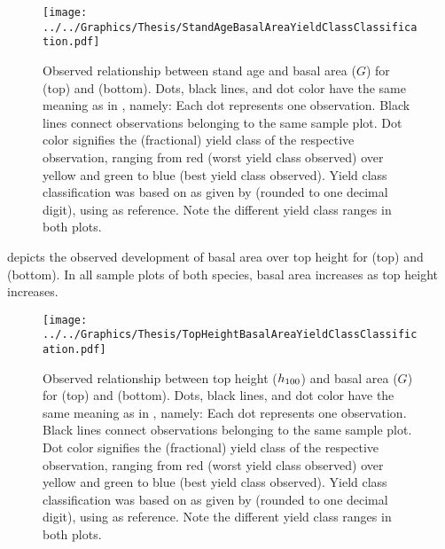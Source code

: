 \begin{figure}[t]
  \texttt{[image: ../../Graphics/Thesis/StandAgeBasalAreaYieldClassClassification.pdf]}
  \caption{Observed relationship between stand age and basal area (\(G\)) for \Beech{} (top) and \Spruce{} (bottom).  Dots, black lines, and dot color have the same meaning as in , namely:  Each dot represents one observation.  Black lines connect observations belonging to the same sample plot.  Dot color signifies the (fractional) yield class of the respective observation, ranging from red (worst yield class observed) over yellow and green to blue (best yield class observed).  Yield class classification was based on \ProductivityIndexText{} as given by  (rounded to one decimal digit), using  as reference.  Note the different yield class ranges in both plots.}
  \label{fig:StandAgeBasalAreaYieldClassClassification}
\end{figure}

 depicts the observed development of basal area over top height for \Beech{} (top) and \Spruce{} (bottom).  In all sample plots of both species, basal area increases as top height increases.

\begin{figure}[t]
  \texttt{[image: ../../Graphics/Thesis/TopHeightBasalAreaYieldClassClassification.pdf]}
  \caption{Observed relationship between top height (\(h_{100}{}\)) and basal area (\(G\)) for \Beech{} (top) and \Spruce{} (bottom).  Dots, black lines, and dot color have the same meaning as in , namely:  Each dot represents one observation.  Black lines connect observations belonging to the same sample plot.  Dot color signifies the (fractional) yield class of the respective observation, ranging from red (worst yield class observed) over yellow and green to blue (best yield class observed).  Yield class classification was based on \ProductivityIndexText{} as given by  (rounded to one decimal digit), using  as reference.  Note the different yield class ranges in both plots.}
  \label{fig:TopHeightBasalAreaYieldClassClassification}
\end{figure}


